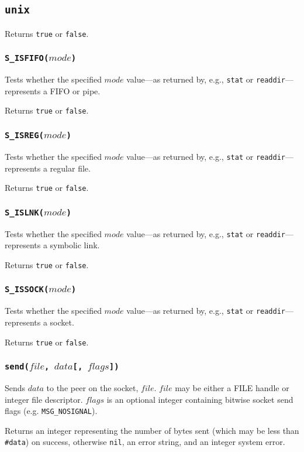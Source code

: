 \documentclass[11pt, oneside]{memoir}
\newcommand*{\true}[0]{\texttt{true}\xspace}
\newcommand*{\false}[0]{\texttt{false}\xspace}
\newcommand*{\nil}[0]{\texttt{nil}\xspace}
\newcommand*{\syscall}[1]{\texttt{#1}\xspace}
\newcommand*{\fn}[1]{\texttt{#1}\xspace}
\newcommand*{\otherwise}[1]{otherwise #1, an error string, and an integer system error}
\newcounter{toccols}
\newenvironment{Module}[1]{
	\subsection{\texttt{#1}}
	\addtocontents{toc}{
		\protect\begin{multicols}{\value{toccols}}
	}
}{
	\addtocontents{toc}{\protect\end{multicols}}
}
\begin{document}
\begin{Module}{unix}
Returns \true or \false.

\subsubsection[\fn{S\_ISFIFO}]{\fn{S\_ISFIFO($mode$)}}

Tests whether the specified $mode$ value---as returned by, e.g., \syscall{stat} or \syscall{readdir}---represents a FIFO or pipe.

Returns \true or \false.

\subsubsection[\fn{S\_ISREG}]{\fn{S\_ISREG($mode$)}}

Tests whether the specified $mode$ value---as returned by, e.g., \syscall{stat} or \syscall{readdir}---represents a regular file.

Returns \true or \false.

\subsubsection[\fn{S\_ISLNK}]{\fn{S\_ISLNK($mode$)}}

Tests whether the specified $mode$ value---as returned by, e.g., \syscall{stat} or \syscall{readdir}---represents a symbolic link.

Returns \true or \false.

\subsubsection[\fn{S\_ISSOCK}]{\fn{S\_ISSOCK($mode$)}}

Tests whether the specified $mode$ value---as returned by, e.g., \syscall{stat} or \syscall{readdir}---represents a socket.

Returns \true or \false.

\subsubsection[\fn{send}]{\fn{send($file$, $data$[, $flags$])}}

Sends $data$ to the peer on the socket, $file$. $file$ may be either a FILE handle or integer file descriptor. $flags$ is an optional integer containing bitwise socket send flags (e.g. \texttt{MSG\_NOSIGNAL}).

Returns an integer representing the number of bytes sent (which may be less than \texttt{\#data}) on success, \otherwise{\nil}.


\end{Module}
\end{document}

